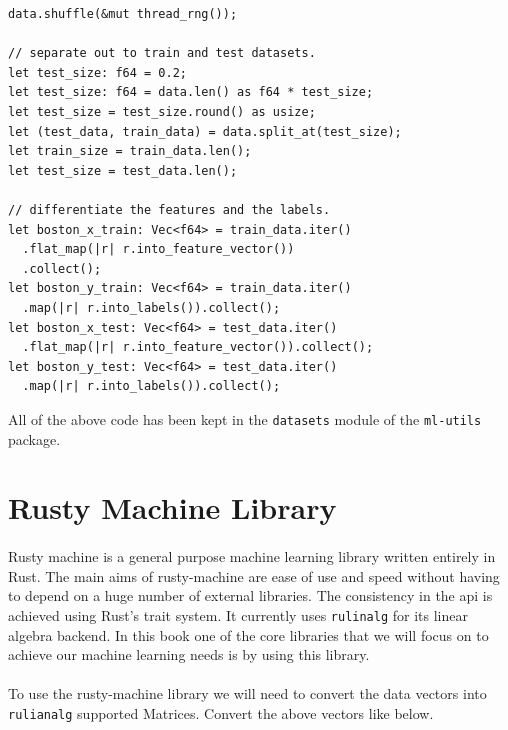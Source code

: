\documentclass{book}
\begin{document}
\begin{lstlisting}[caption={chapter2\\/rustlymachine\_regression\\/src\\/lin\_reg\\.rs}]
data.shuffle(&mut thread_rng());

// separate out to train and test datasets.
let test_size: f64 = 0.2;
let test_size: f64 = data.len() as f64 * test_size;
let test_size = test_size.round() as usize;
let (test_data, train_data) = data.split_at(test_size);
let train_size = train_data.len();
let test_size = test_data.len();

// differentiate the features and the labels.
let boston_x_train: Vec<f64> = train_data.iter()
  .flat_map(|r| r.into_feature_vector())
  .collect();
let boston_y_train: Vec<f64> = train_data.iter()
  .map(|r| r.into_labels()).collect();
let boston_x_test: Vec<f64> = test_data.iter()
  .flat_map(|r| r.into_feature_vector()).collect();
let boston_y_test: Vec<f64> = test_data.iter()
  .map(|r| r.into_labels()).collect();
\end{lstlisting}

All of the above code has been kept in the \lstinline{datasets} module of the \lstinline{ml-utils} package.

\label{sub:dataset_specific_code}

\section{Rusty Machine Library}%

\paragraph{}%
Rusty machine is a general purpose machine learning library written entirely in Rust. The main aims of rusty-machine are ease of use and speed without having to depend on a huge number of external libraries. The consistency in the api is achieved using Rust’s trait system. It currently uses \lstinline{rulinalg} for its linear algebra backend. In this book one of the core libraries that we will focus on to achieve our machine learning needs is by using this library.
\label{par:}

\paragraph{}%
To use the rusty-machine library we will need to convert the data vectors into \lstinline{rulianalg} supported Matrices. Convert the above vectors like below.
\label{par:}
\end{document}
